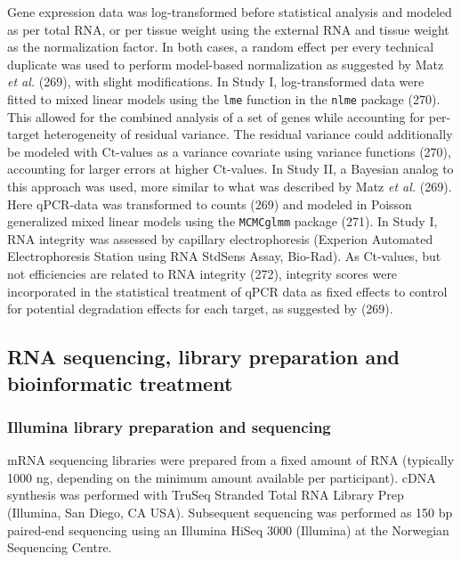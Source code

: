 \documentclass[twoside,10pt]{gihclass} %
\begin{document}
Gene expression data was log-transformed before statistical analysis and modeled as per total RNA,
or per tissue weight using the external RNA and tissue weight as the normalization factor.
In both cases, a random effect per every technical duplicate was used to perform model-based normalization as suggested by Matz \emph{et al.}
(269), with slight modifications. In Study I, log-transformed data were fitted to mixed linear models using the \texttt{lme} function in the \texttt{nlme} package
(270).
This allowed for the combined analysis of a set of genes while accounting for per-target heterogeneity of residual variance. The residual variance could additionally be modeled with Ct-values as a variance covariate using variance functions
(270),
accounting for larger errors at higher Ct-values.
In Study II, a Bayesian analog to this approach was used, more similar to what was described by Matz \emph{et al.}
(269).
Here qPCR-data was transformed to counts (269) and modeled in Poisson generalized mixed linear models using the \texttt{MCMCglmm} package
(271).
In Study I, RNA integrity was assessed by capillary electrophoresis (Experion Automated Electrophoresis Station using RNA StdSens Assay, Bio-Rad).
As Ct-values, but not efficiencies are related to RNA integrity (272),
integrity scores were incorporated in the statistical treatment of qPCR data as fixed effects to control for potential degradation effects for each target, as suggested by
(269).

\hypertarget{rna-sequencing-library-preparation-and-bioinformatic-treatment}{%
\subsection{RNA sequencing, library preparation and bioinformatic treatment}\label{rna-sequencing-library-preparation-and-bioinformatic-treatment}}

\hypertarget{illumina-library-preparation-and-sequencing}{%
\subsubsection{Illumina library preparation and sequencing}\label{illumina-library-preparation-and-sequencing}}

mRNA sequencing libraries were prepared from a fixed amount of RNA (typically 1000 ng, depending on the minimum amount available per participant). cDNA synthesis was performed with TruSeq Stranded Total RNA Library Prep (Illumina, San Diego, CA USA). Subsequent sequencing was performed as 150 bp paired-end sequencing using an Illumina HiSeq 3000 (Illumina) at the Norwegian Sequencing Centre.
\end{document}
